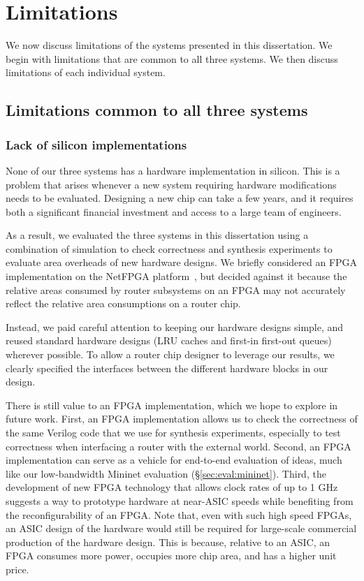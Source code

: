 \chapter{Limitations}
\label{chap:limitations}

We now discuss limitations of the systems presented in this dissertation. We
begin with limitations that are common to all three systems. We then discuss
limitations of each individual system.

\section{Limitations common to all three systems}

\subsection{Lack of silicon implementations} None of our three systems has a
hardware implementation in silicon. This is a problem that arises whenever a
new system requiring hardware modifications needs to be evaluated. Designing a
new chip can take a few years, and it requires both a significant financial
investment and access to a large team of engineers.

 As a result, we evaluated the three systems in this dissertation using a
combination of simulation to check correctness and synthesis experiments to
evaluate area overheads of new hardware designs. We briefly considered an FPGA
implementation on the NetFPGA platform~\cite{netfpga}, but decided against it
because the relative areas consumed by router subsystems on an FPGA may not
accurately reflect the relative area consumptions on a router chip.

Instead, we paid careful attention to keeping our hardware designs simple, and
reused standard hardware designs (\eg LRU caches and first-in first-out queues)
wherever possible. To allow a router chip designer to leverage our results, we
clearly specified the interfaces between the different hardware blocks in our
design.

There is still value to an FPGA implementation, which we hope to explore in
future work. First, an FPGA implementation allows us to check the correctness
of the same Verilog code that we use for synthesis experiments, especially to
test correctness when interfacing a router with the external world. Second, an
FPGA implementation can serve as a vehicle for end-to-end evaluation of ideas,
much like our low-bandwidth Mininet evaluation (\S\ref{sec:eval:mininet}).
Third, the development of new FPGA technology that allows clock rates of up to
1 GHz~\cite{hyperflex} suggests a way to prototype hardware at near-ASIC speeds
while benefiting from the reconfigurability of an FPGA. Note that, even with
such high speed FPGAs, an ASIC design of the hardware would still be required
for large-scale commercial production of the hardware design.  This is because,
relative to an ASIC, an FPGA consumes more power, occupies more chip area,
and has a higher unit price.

